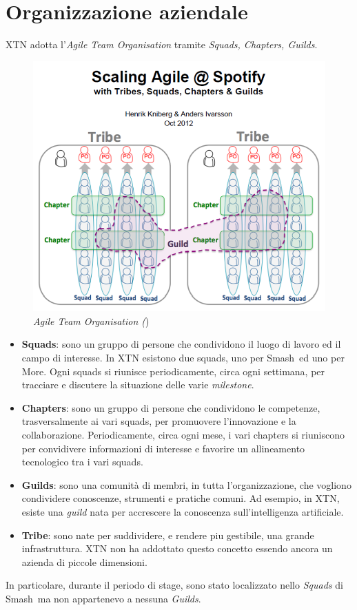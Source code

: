 \section{Organizzazione aziendale}
XTN adotta l'\textit{Agile Team Organisation} tramite \textit{Squads, Chapters, Guilds}.
\begin{figure}[ht]
	\centering
	\includegraphics[scale=0.6]{immagini/agile-org.png}
	\caption{\textit{Agile Team Organisation (})}
\end{figure}
\begin{itemize}
\item{\textbf{Squads}:} sono un gruppo di persone che condividono il luogo di lavoro ed il campo di interesse. In XTN esistono due squads, uno per  Smash\textregistered\ ed uno per More\textregistered. Ogni squads si riunisce periodicamente, circa ogni settimana, per tracciare e discutere la situazione delle varie \textit{milestone}. 
\item{\textbf{Chapters}:} sono un gruppo di persone che condividono le competenze, trasversalmente ai vari squads, per promuovere l'innovazione e la collaborazione. Periodicamente, circa ogni mese, i vari chapters si riuniscono per convidivere informazioni di interesse e favorire un allineamento tecnologico tra i vari squads.
\item{\textbf{Guilds}:} sono una comunità di membri, in tutta l'organizzazione, che vogliono condividere conoscenze, strumenti e pratiche comuni. Ad esempio, in XTN, esiste una \textit{guild} nata per accrescere la conoscenza sull'intelligenza artificiale.
\item{\textbf{Tribe}:} sono nate per suddividere, e rendere piu gestibile, una grande infrastruttura. XTN non ha addottato questo concetto essendo ancora un azienda di piccole dimensioni.
\end{itemize}
In particolare, durante il periodo di stage, sono stato localizzato nello \textit{Squads} di Smash\textregistered\, ma non appartenevo a nessuna \textit{Guilds}.
\newpage

